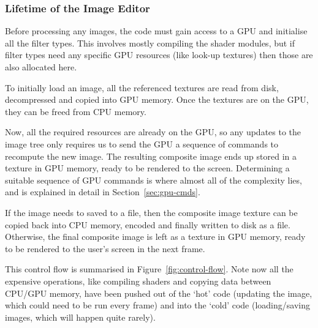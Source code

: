 \documentclass[12pt]{article}
\begin{document}
\subsubsection{Lifetime of the Image Editor}

Before processing any images, the code must gain access to a GPU and initialise all the filter
types.  This involves mostly compiling the shader modules, but if filter types need any specific GPU
resources (like look-up textures) then those are also allocated here.

To initially load an image, all the referenced textures are read from disk, decompressed and copied
into GPU memory.  Once the textures are on the GPU, they can be freed from CPU memory.

Now, all the required resources are already on the GPU, so any updates to the image tree only
requires us to send the GPU a sequence of commands to recompute the new image.  The resulting
composite image ends up stored in a texture in GPU memory, ready to be rendered to the screen.
Determining a suitable sequence of GPU commands is where almost all of the complexity lies, and is
explained in detail in Section~\ref{sec:gpu-cmds}.

If the image needs to saved to a file, then the composite image texture can be copied back into CPU
memory, encoded and finally written to disk as a file.  Otherwise, the final composite image is left
as a texture in GPU memory, ready to be rendered to the user's screen in the next frame.

This control flow is summarised in Figure~\ref{fig:control-flow}.  Note now all the expensive
operations, like compiling shaders and copying data between CPU/GPU memory, have been pushed out of
the `hot' code (updating the image, which could need to be run every frame) and into the `cold' code
(loading/saving images, which will happen quite rarely).
\end{document}
